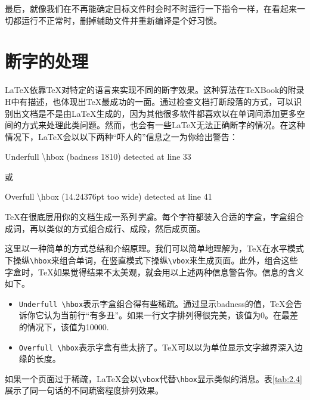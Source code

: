 最后，就像我们在不再能确定目标文件时会时不时运行一下指令一样，在看起来一切都运行不正常时，删掉辅助文件并重新编译是个好习惯。

\section{断字的处理}

\LaTeX 依靠\TeX 对特定的语言来实现不同的断字效果。这种算法在\TeX Book的附录H中有描述，也体现出\TeX 最成功的一面。通过检查文档打断段落的方式，可以识别出文档是不是由\LaTeX 生成的，因为其他很多软件都喜欢以在单词间添加更多空间的方式来处理此类问题。然而，也会有一些\LaTeX 无法正确断字的情况。在这种情况下，\LaTeX 会以以下两种“吓人的”信息之一为你给出警告：

\begin{dmd}
Underfull \backslash hbox (badness 1810) detected at line 33
\end{dmd}

或

\begin{dmd}
Overfull \backslash hbox (14.24376pt too wide) detected at line 41
\end{dmd}

\TeX 在很底层用你的文档生成一系列\emph{字盒}。每个字符都装入合适的字盒，字盒组合成词，再以类似的方式组合成行、成段，然后成页面。

这里以一种简单的方式总结和介绍原理。我们可以简单地理解为，\TeX 在水平模式下操纵\verb|\hbox|来组合单词，在竖直模式下操纵\verb|\vbox|来生成页面。此外，组合这些字盒时，\TeX 如果觉得结果不太美观，就会用以上述两种信息警告你。信息的含义如下。

\begin{itemize}
  \item \verb|Underfull \hbox|表示字盒组合得有些稀疏。通过显示badness的值，\TeX 会告诉你它认为当前行“有多丑”。如果一行文字排列得很完美，该值为0。在最差的情况下，该值为10000.
  \item \verb|Overfull \hbox|表示字盒有些太挤了。\TeX 可以以为单位显示文字越界深入边缘的长度。
\end{itemize}

如果一个页面过于稀疏，\LaTeX 会以\verb|\vbox|代替\verb|\hbox|显示类似的消息。表\ref{tab:2.4}展示了同一句话的不同疏密程度排列效果。

